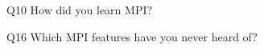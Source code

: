 \begin{description}%
\item{Q10} How did you learn MPI?%
\item{Q16} Which MPI features have you never heard of?%
\end{description}%
